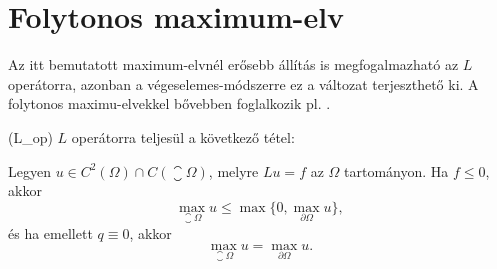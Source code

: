 \section{Folytonos maximum-elv}

Az itt bemutatott maximum-elvnél erősebb állítás is megfogalmazható az $L$ operátorra, azonban a végeselemes-módszerre ez a változat terjeszthető ki. A folytonos maximu-elvekkel bővebben foglalkozik pl. \cite{gilbarg}.

 
\Aref({L_op}) $L$ operátorra teljesül a következő tétel:

\begin{theorem} \label{cmp}
	Legyen $u \in C^2(\Omega) \cap C(\closure{\Omega})$, melyre $L u = f$ az $\Omega$ tartományon. Ha $f \leq 0$, akkor
	\begin{equation}
		\max_{\closure{\Omega}} u \leq \max \{0, \max_{\partial\Omega} u\},
	\end{equation}
	 és ha emellett $q \equiv 0$, akkor
	\begin{equation}
		\max_{\closure{\Omega}} u =  \max_{\partial\Omega} u .
	\end{equation}
\end{theorem}


